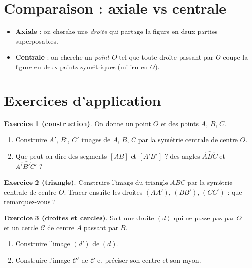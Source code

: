 
\clearpage
\section{Comparaison : axiale vs centrale}

\begin{methodebox}
\begin{itemize}
  \item \textbf{Axiale} : on cherche une \textit{droite} qui partage la figure en deux parties superposables.
  \item \textbf{Centrale} : on cherche un \textit{point $O$} tel que toute droite passant par $O$ coupe la figure en deux points sym\'etriques (milieu en $O$).
\end{itemize}
\end{methodebox}

\section{Exercices d'application}

\begin{exercisebox}
\textbf{Exercice 1 (construction)}. On donne un point $O$ et des points $A$, $B$, $C$.
\begin{enumerate}
  \item Construire $A'$, $B'$, $C'$ images de $A$, $B$, $C$ par la sym\'etrie centrale de centre $O$.
  \item Que peut-on dire des segments $[AB]$ et $[A'B']$ ? des angles $\widehat{ABC}$ et $\widehat{A'B'C'}$ ?
\end{enumerate}
\end{exercisebox}

\begin{exercisebox}
\textbf{Exercice 2 (triangle)}. Construire l'image du triangle $ABC$ par la sym\'etrie centrale de centre $O$. Tracer ensuite les droites $(AA')$, $(BB')$, $(CC')$ : que remarquez-vous ?
\end{exercisebox}

\begin{exercisebox}
\textbf{Exercice 3 (droites et cercles)}. Soit une droite $(d)$ qui ne passe pas par $O$ et un cercle $\mathcal C$ de centre $A$ passant par $B$.
\begin{enumerate}
  \item Construire l'image $(d')$ de $(d)$.
  \item Construire l'image $\mathcal C'$ de $\mathcal C$ et pr\'eciser son centre et son rayon.
\end{enumerate}
\end{exercisebox}

